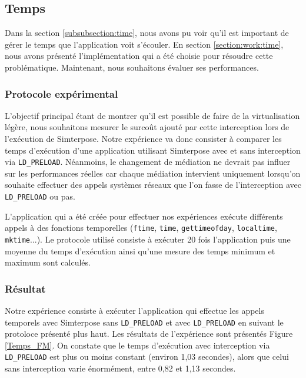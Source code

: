 \subsection{Temps}
\label{section:temps}

Dans la section \ref{subsubsection:time}, nous avons pu voir qu'il est important de gérer le temps que l'application voit s'écouler. En section \ref{section:work:time}, nous avons présenté l'implémentation qui a été choisie pour résoudre cette problématique. Maintenant, nous souhaitons évaluer ses performances.

\subsubsection{Protocole expérimental}
L'objectif principal étant de montrer qu'il est possible de faire de la virtualisation légère, nous souhaitons mesurer le surcoût ajouté par cette interception lors de l'exécution de Simterpose. Notre expérience va donc consister à comparer les temps d'exécution d'une application utilisant Simterpose avec et sans interception via \texttt{LD\_PRELOAD}. Néanmoins, le changement de médiation ne devrait pas influer sur les performances réelles car chaque médiation intervient uniquement lorsqu'on souhaite effectuer des appels systèmes réseaux que l'on fasse de l'interception avec \texttt{LD\_PRELOAD} ou pas.

L'application qui a été créée pour effectuer nos expériences exécute différents appels à des fonctions temporelles (\texttt{ftime}, \texttt{time}, \texttt{gettimeofday}, \texttt{localtime}, \texttt{mktime}...). Le protocole utilisé consiste à exécuter 20 fois l'application puis une moyenne du temps d'exécution ainsi qu'une mesure des temps minimum et maximum sont calculés.

\subsubsection{Résultat}
 Notre expérience consiste à exécuter l'application qui effectue les appels temporels avec Simterpose sans \texttt{LD\_PRELOAD} et avec \texttt{LD\_PRELOAD} en suivant le protoloce présenté plus haut. Les résultats de l'expérience sont présentés Figure \ref{Temps_FM}. On constate que le temps d'exécution avec interception via \texttt{LD\_PRELOAD} est plus ou moins constant (environ 1,03 secondes), alors que celui sans interception varie énormément, entre 0,82 et 1,13 secondes. 


